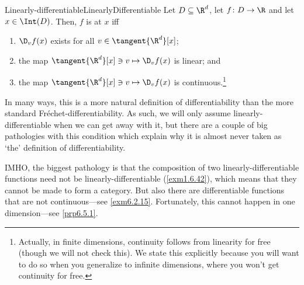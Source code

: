 \begin{dfn}{Linearly-differentiable}{LinearlyDifferentiable}
	Let $D\subseteq \R ^d$, let $f\colon D\rightarrow \R$ and let $x\in \Int (D)$.  Then, $f$ is  at $x$ iff
	\begin{enumerate}
		\item $\D _vf(x)$ exists for all $v\in \tangent{\R ^d}[x]$;
		\item the map $\tangent{\R ^d}[x]\ni v\mapsto \D _vf(x)$ is linear; and
		\item the map $\tangent{\R ^d}[x]\ni v \mapsto \D _vf(x)$ is continuous.\footnote{Actually, in finite dimensions, continuity follows from linearity for free (though we will not check this).  We state this explicitly because you will want to do so when you generalize to infinite dimensions, where you won't get continuity for free.}
	\end{enumerate}
	\begin{rmk}
		In many ways, this is a more natural definition of differentiability than the more standard Fréchet-differentiability.  As such, we will only assume linearly-differentiable when we can get away with it, but there are a couple of big pathologies with this condition which explain why it is almost never taken as `the' definition of differentiability.
		
		IMHO, the biggest pathology is that the composition of two linearly-differentiable functions need not be linearly-differentiable (\cref{exm1.6.42}), which means that they cannot be made to form a category.  But also there are differentiable functions that are not continuous---see \cref{exm6.2.15}.  Fortunately, this cannot happen in one dimension---see \cref{prp6.5.1}.
	\end{rmk}
\end{dfn}
